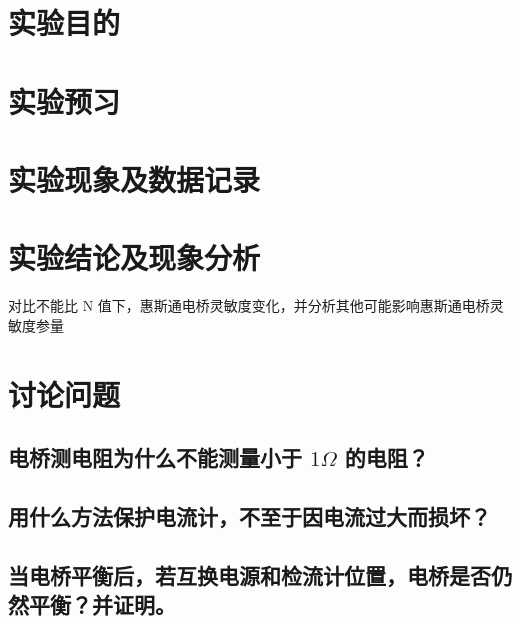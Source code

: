 \documentclass[signature=data]{physicsreport}
\begin{document}
\maketitle
\section{实验目的}
\section{实验预习}
\newpage

\section{实验现象及数据记录}
\makeatletter
{}
\makeatother

\newpage



\section{实验结论及现象分析}
对比不能比 N 值下，惠斯通电桥灵敏度变化，并分析其他可能影响惠斯通电桥灵敏度参量

\section{讨论问题}

\subsection{电桥测电阻为什么不能测量小于 $1\Omega$ 的电阻？}

\subsection{用什么方法保护电流计，不至于因电流过大而损坏？}

\subsection{当电桥平衡后，若互换电源和检流计位置，电桥是否仍然平衡？并证明。}
\end{document}
